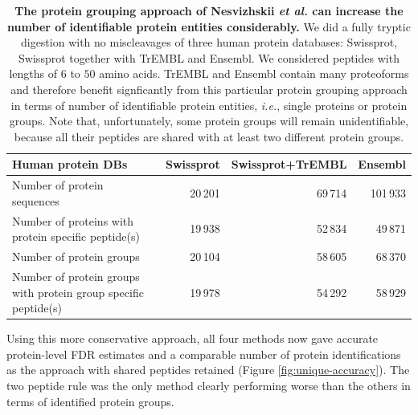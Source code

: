 \documentclass{article}
\begin{document}
\begin{table}[!htp]
  \begin{center}
  
\begin{tabular}{|l|r|r|r|}
\hline
Human protein DBs & Swissprot & Swissprot+TrEMBL & Ensembl\\
\hline
Number of protein sequences & 20\,201 & 69\,714 & 101\,933\\
\hline
Number of proteins with protein specific peptide(s) & 19\,938 & 52\,834 &
49\,871\\
\hline
Number of protein groups & 20\,104 & 58\,605 & 68\,370\\
\hline
Number of protein groups with protein group specific peptide(s) & 19\,978 &
54\,292 & 58\,929\\
\hline
\end{tabular}

  \end{center}
  \caption{\label{tab:duplicate-proteins}\textbf{The protein grouping
approach of Nesvizhskii {\em et al.} can increase the number of
identifiable protein entities considerably.} We did a fully tryptic
digestion with no miscleavages of three human protein databases:
Swissprot, Swissprot together with TrEMBL and Ensembl. We considered
peptides with lengths of $6$ to $50$ amino acids. TrEMBL and Ensembl
contain many proteoforms and therefore benefit signficantly from this
particular protein grouping approach in terms of number of
identifiable protein entities, {\em i.e.}, single proteins or protein
groups. Note that, unfortunately, some protein groups will remain
unidentifiable, because all their peptides are shared with at least
two different protein groups.}
\end{table}

Using this more conservative approach, all four methods now gave
accurate protein-level FDR estimates and a comparable number of
protein identifications as the approach with shared peptides retained
(Figure \ref{fig:unique-accuracy}). The two peptide rule was the only
method clearly performing worse than the others in terms of
identified protein groups.
\end{document}

